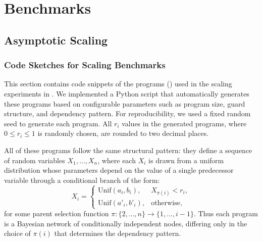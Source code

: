 


\section{Benchmarks}
\label{app:benchmarks}
\subsection{Asymptotic Scaling}

\subsubsection{Code Sketches for Scaling Benchmarks}\label{app:synthetic-sketches}
This section contains code snippets of the programs  () used in the scaling experiments in . We implemented a Python script that automatically generates these programs based on configurable parameters such as program size, guard structure, and dependency pattern. For reproducibility, we used a fixed random seed to generate each program. All $r_i$ values in the generated programs, where $0 \leq r_i \leq 1$ is randomly chosen, are rounded to two decimal places.

All of these programs follow the same structural pattern: they define a sequence of random variables $X_1,\ldots,X_n$, where each $X_i$ is drawn from a uniform distribution whose parameters depend on the value of a single predecessor variable through a conditional branch of the form:
\[
X_i =
  \begin{cases}
    \mathrm{Unif}(a_i,b_i), & X_{\pi(i)} < r_i, \\[2pt]
    \mathrm{Unif}(a'_i,b'_i), & \text{otherwise},
  \end{cases}
\]
for some parent selection function $\pi : \{2,\ldots,n\} \to \{1,\ldots,i-1\}$.  
Thus each program is a Bayesian network of conditionally independent nodes, differing only in the choice of $\pi(i)$ that determines the dependency pattern.


